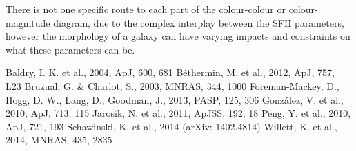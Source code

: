 \documentclass{mn2e}
\begin{document}
There is not one specific route to each part of the colour-colour or colour-magnitude diagram, due to the complex interplay between the SFH parameters, however the morphology of a galaxy can have varying impacts and constraints on what these parameters can be.

\begin{thebibliography}{}
 Baldry, I. K. et al., 2004, ApJ, 600, 681
 B\'ethermin, M. et al., 2012, ApJ, 757, L23
 Bruzual, G. \& Charlot, S., 2003, MNRAS, 344, 1000
 Foreman-Mackey, D., Hogg, D. W., Lang, D., Goodman, J., 2013, PASP, 125, 306
 Gonz\'alez, V. et al., 2010, ApJ, 713, 115
 Jarosik, N. et al., 2011, ApJSS, 192, 18
 Peng, Y. et al., 2010, ApJ, 721, 193
 Schawinski, K. et al., 2014 (arXiv: 1402.4814)
 Willett, K. et al., 2014, MNRAS, 435, 2835
\end{thebibliography}
\end{document}
